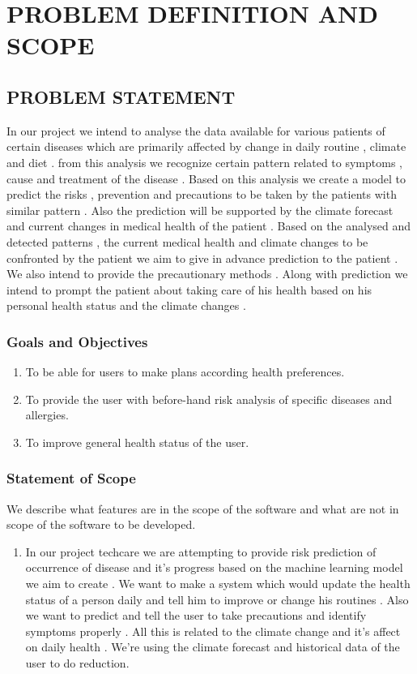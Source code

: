 \documentclass[12pt,a4paper]{report}
\begin{document}
\chapter{PROBLEM DEFINITION AND SCOPE}
\newpage
\section{PROBLEM STATEMENT}
In our project we intend to analyse the data available for various patients of certain diseases which are primarily affected by change in daily routine , climate and diet   . from this analysis we recognize certain pattern related to symptoms , cause and treatment of the disease . Based on this analysis we create a model to predict the risks , prevention and precautions to be taken by the patients with similar pattern . Also the prediction will be supported by the climate forecast and current changes in medical health of the patient . Based on the analysed and detected patterns , the current medical health and climate changes to be confronted by the patient we aim to give in advance prediction to the patient . We also intend to provide the precautionary methods . Along with prediction we intend to prompt the patient about taking care of his health based on his personal health status and the climate changes  .

\subsection{Goals and Objectives}
\begin{enumerate}
\item To be able for users to make plans according health preferences.
\item To provide the user with before-hand risk analysis of specific diseases and allergies.
\item To improve general health status of the user.
\end{enumerate}

\subsection{Statement of Scope}
We describe what features are in the scope of the software and what are not in scope of the software to be developed.
\begin{enumerate}
	\item In our project techcare we are attempting to provide risk prediction of occurrence of disease
	and it's progress based on the machine learning model we aim to create . We want to make a system
	which would update the health status of a person daily and tell him to improve or change his
	routines . Also we want to predict and tell the user to take precautions and identify symptoms
	properly . All this is related to the climate change and it's affect on daily health . We're using the
	climate forecast and historical data of the user to do reduction.
	
\end{enumerate}
\end{document}
